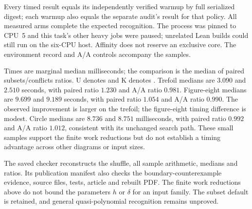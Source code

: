 Every timed result equals its independently verified warmup by full
serialized digest; each warmup also equals the separate audit's result
for that policy.  All measured arms complete the expected recognition.
The process was pinned to CPU~5 and this task's other heavy jobs were
paused; unrelated Lean builds could still run on the six-CPU host.
Affinity does not reserve an exclusive core.  The environment record
and A/A controls accompany the samples.

\begin{center}
\small
\setlength{\tabcolsep}{3pt}

\end{center}

Times are marginal median milliseconds; the comparison is the median
of paired subsets/conflicts ratios.  U denotes  and K
denotes .  Trefoil medians are $3.090$ and $2.510$
seconds, with paired ratio $1.230$ and A/A ratio $0.981$.
Figure-eight medians are $9.699$ and $9.189$ seconds, with paired
ratio $1.054$ and A/A ratio $0.990$.  The observed improvement is
larger on the trefoil; the figure-eight timing difference is modest.
Circle medians are $8.736$ and $8.751$ milliseconds, with paired ratio
$0.992$ and A/A ratio $1.012$, consistent with its unchanged search path.
These small samples support the finite work reductions but do not establish
a timing advantage across other diagrams or input sizes.

The saved checker reconstructs the shuffle,
all sample arithmetic, medians and ratios.  Its publication manifest
also checks the boundary-counterexample evidence, source files, tests,
article and rebuilt PDF.  The finite work reductions above do not bound
the parameters $h$ or $\delta$ for an input family.  The subset default
is retained, and general quasi-polynomial recognition remains unproved.
